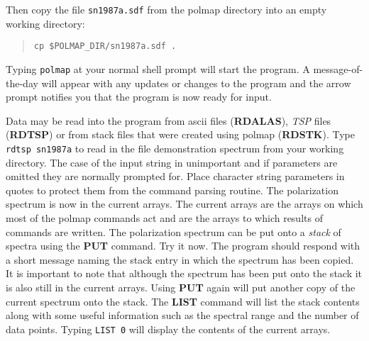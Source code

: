 Then copy the file {\tt sn1987a.sdf} from the {\sc polmap} directory
into an empty working directory:

\begin{quote}
{\tt cp~\$POLMAP\_DIR/sn1987a.sdf~.}
\end{quote}

Typing {\tt polmap} at your normal shell prompt will start the
program.  A message-of-the-day will appear with any updates or changes
to the program and the arrow prompt notifies you that the program is
now ready for input.

Data may be read into the program from ascii files ({\bf RDALAS}), {\it
TSP} files ({\bf RDTSP}) or from stack files that were created using
{\sc polmap} ({\bf RDSTK}).   Type {\tt rdtsp sn1987a} to read in the
file demonstration spectrum from your working directory. The case of
the input string in unimportant and if parameters are omitted they are
normally prompted for. Place character string parameters in quotes to
protect them from the command parsing routine.  The polarization
spectrum is now in the current arrays. The current arrays are the
arrays on which most of the {\sc polmap} commands act and are the
arrays to which results of commands are written. The polarization
spectrum can be put onto a {\it stack} of spectra using the {\bf PUT}
command. Try it now. The program should respond with a short message
naming the stack entry in which the spectrum has been copied. It is
important to note that although the spectrum has been put onto the
stack it is also still in the current arrays.  Using {\bf PUT} again
will put another copy of the current spectrum onto the stack. The {\bf
LIST} command will list the stack contents along with some useful
information such as the spectral range and the number of data points.
Typing {\tt LIST 0} will display the contents of the current arrays.

